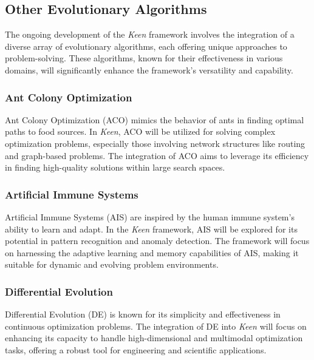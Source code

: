     \subsection{Other Evolutionary Algorithms}
    \label{sec:future:other}
        The ongoing development of the \textit{Keen} framework involves the integration of a diverse array of 
        evolutionary algorithms, each offering unique approaches to problem-solving. These algorithms, known for their 
        effectiveness in various domains, will significantly enhance the framework's versatility and capability.

        \subsubsection{Ant Colony Optimization}
            Ant Colony Optimization (ACO) mimics the behavior of ants in finding optimal paths to food sources. In 
            \textit{Keen}, ACO will be utilized for solving complex optimization problems, especially those involving 
            network structures like routing and graph-based problems. The integration of ACO aims to leverage its 
            efficiency in finding high-quality solutions within large search spaces.

        \subsubsection{Artificial Immune Systems}
            Artificial Immune Systems (AIS) are inspired by the human immune system's ability to learn and adapt. In the 
            \textit{Keen} framework, AIS will be explored for its potential in pattern recognition and anomaly 
            detection. The framework will focus on harnessing the adaptive learning and memory capabilities of AIS, 
            making it suitable for dynamic and evolving problem environments.

        \subsubsection{Differential Evolution}
            Differential Evolution (DE) is known for its simplicity and effectiveness in continuous optimization 
            problems. The integration of DE into \textit{Keen} will focus on enhancing its capacity to handle 
            high-dimensional and multimodal optimization tasks, offering a robust tool for engineering and scientific 
            applications.

